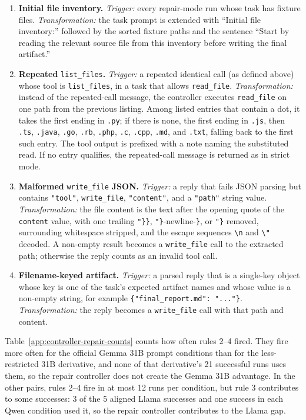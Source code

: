 \begin{enumerate}[leftmargin=*]
  \item \textbf{Initial file inventory.} \emph{Trigger:} every repair-mode run
  whose task has fixture files. \emph{Transformation:} the task prompt is
  extended with ``Initial file inventory:'' followed by the sorted fixture
  paths and the sentence ``Start by reading the relevant source file from this
  inventory before writing the final artifact.''
  \item \textbf{Repeated} \texttt{list\_files}\textbf{.} \emph{Trigger:} a repeated
  identical call (as defined above) whose tool is \texttt{list\_files}, in a
  task that allows \texttt{read\_file}. \emph{Transformation:} instead of the
  repeated-call message, the controller executes \texttt{read\_file} on one
  path from the previous listing. Among listed entries that contain a dot, it
  takes the first ending in \texttt{.py}; if there is none, the first ending in
  \texttt{.js}, then \texttt{.ts}, \texttt{.java}, \texttt{.go}, \texttt{.rb},
  \texttt{.php}, \texttt{.c}, \texttt{.cpp}, \texttt{.md}, and \texttt{.txt},
  falling back to the first such entry. The tool output is prefixed with a
  note naming the substituted read. If no entry qualifies, the repeated-call
  message is returned as in strict mode.
  \item \textbf{Malformed} \texttt{write\_file} \textbf{JSON.} \emph{Trigger:} a reply
  that fails JSON parsing but contains \verb|"tool"|, \texttt{write\_file},
  \verb|"content"|, and a \verb|"path"| string value. \emph{Transformation:} the
  file content is the text after the opening quote of the \texttt{content}
  value, with one trailing \verb|"}}|, \verb|"}|-newline-\verb|}|, or
  \verb|"}| removed, surrounding whitespace stripped, and the escape sequences
  \verb|\n| and \verb|\"| decoded. A non-empty result becomes a
  \texttt{write\_file} call to the extracted path; otherwise the reply counts as
  an invalid tool call.
  \item \textbf{Filename-keyed artifact.} \emph{Trigger:} a parsed reply that is
  a single-key object whose key is one of the task's expected artifact names
  and whose value is a non-empty string, for example
  \verb|{"final_report.md": "..."}|. \emph{Transformation:} the reply becomes a
  \texttt{write\_file} call with that path and content.
\end{enumerate}

Table~\ref{app:controller-repair-counts} counts how often rules 2--4 fired.
They fire more often for the official Gemma 31B prompt conditions than for the
less-restricted 31B derivative, and none of that derivative's 21 successful
runs uses them, so the repair controller does not create the Gemma 31B
advantage. In the other pairs, rules 2--4 fire in at most 12 runs per
condition, but rule 3 contributes to some successes: 3 of the 5 aligned Llama
successes and one success in each Qwen condition used it, so the repair
controller contributes to the Llama gap.

